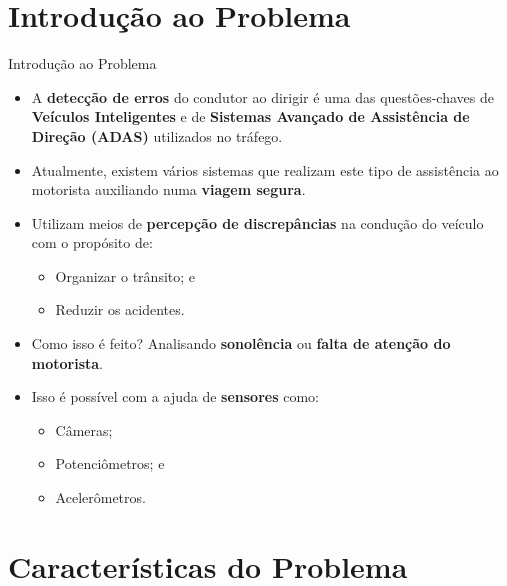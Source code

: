 \documentclass[aspectratio=169]{beamer}
\begin{document}
\section{Introdução ao Problema}
 
\begin{frame}{Introdução ao Problema}
	\begin{itemize}
		\item A \textbf{detecção de erros} do condutor ao dirigir é uma das questões-chaves de \textbf{Veículos Inteligentes} e de \textbf{Sistemas Avançado de Assistência de Direção (ADAS)} utilizados no tráfego.
		
		\item Atualmente, existem vários sistemas que realizam este tipo de assistência ao motorista auxiliando numa \textbf{viagem segura}.
		
		\item Utilizam meios de \textbf{percepção de discrepâncias} na condução do veículo com o propósito de:
		\begin{itemize}
			\item Organizar o trânsito; e
			\item Reduzir os acidentes.
		\end{itemize}
		
			\bigskip
		
		\item Como isso é feito? \pause Analisando \textbf{sonolência} ou \textbf{falta de atenção do motorista}.
		
		 \item Isso é possível com a ajuda de \textbf{sensores} como:
		 \begin{itemize}
		 	\item Câmeras;
		 	\item Potenciômetros; e 
		 	\item Acelerômetros.
		 \end{itemize}
	\end{itemize}
\end{frame}


\section{Características do Problema}
\end{document}
